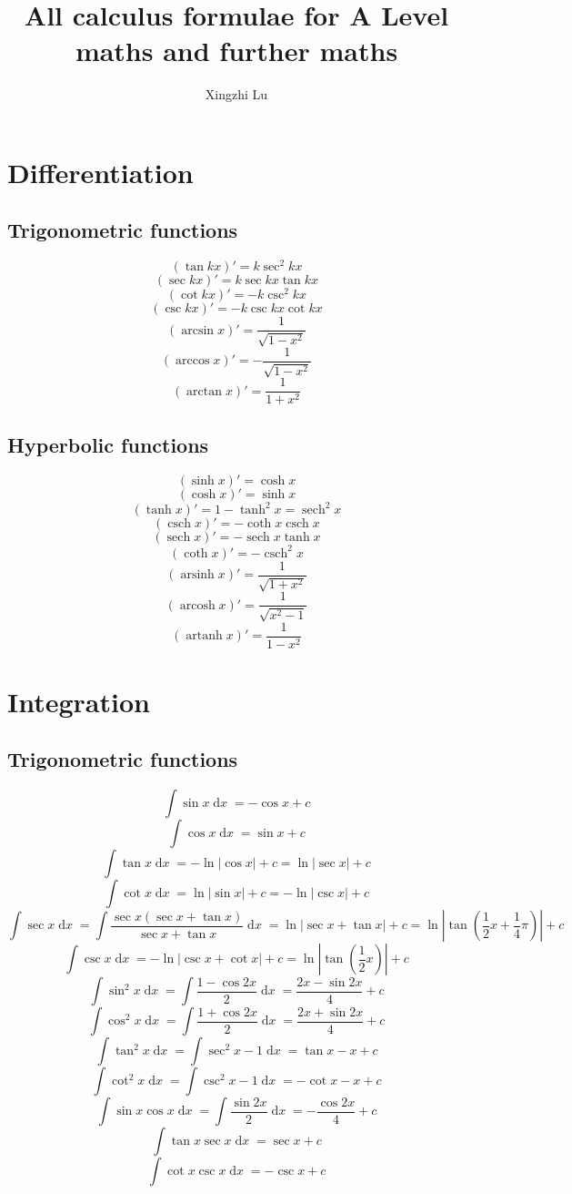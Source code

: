 \documentclass[fleqn, 11pt]{article}
\title{All calculus formulae for A Level maths and further maths}
\author{Xingzhi Lu}
\date{}
\DeclareMathOperator\dx{\mathrm{d}\mathit{x}}
\DeclareMathOperator\sech{sech}
\DeclareMathOperator\csch{csch}
\DeclareMathOperator\arsinh{arsinh}
\DeclareMathOperator\arcosh{arcosh}
\DeclareMathOperator\artanh{artanh}
\begin{document}
	\maketitle
	
	\section{Differentiation}
	\subsection{Trigonometric functions}
	\[(\tan kx)' = k\sec^2 kx\]
	\[(\sec kx)' = k\sec kx \tan kx\]
	\[(\cot kx)' = -k\csc^2 kx\]
	\[(\csc kx)' = -k\csc kx \cot kx\]
	\[(\arcsin x)' = \frac{1}{\sqrt{1-x^2}}\]
	\[(\arccos x)' = -\frac{1}{\sqrt{1-x^2}}\]
	\[(\arctan x)' = \frac{1}{1+x^2}\]
	\subsection{Hyperbolic functions}
	\[(\sinh x)'=\cosh x\]
	\[(\cosh x)'=\sinh x\]
	\[(\tanh x)'=1-\tanh^2 x = \sech^2 x\]
	\[(\csch x)'=-\coth x \csch x\]
	\[(\sech x)'=-\sech x \tanh x\]
	\[(\coth x)'=-\csch^2 x\]
	\[(\arsinh x)' = \dfrac{1}{\sqrt{1+x^2}}\]
	\[(\arcosh x)' = \dfrac{1}{\sqrt{x^2-1}}\]
	\[(\artanh x)' = \dfrac{1}{1-x^2}\]
	
	\pagebreak
	
	\section{Integration}
	\subsection{Trigonometric functions}
	\[\int\sin x \dx = -\cos x + c\]
	\[\int\cos x \dx = \sin x + c\]
	\[\int \tan x \dx = -\ln |\cos x| + c= \ln |\sec x| + c\]
	\[\int \cot x \dx = \ln |\sin x| + c = -\ln |\csc x| + c\]
	\[\int \sec x \dx = \int \frac{\sec x(\sec x + \tan x)}{\sec x + \tan x} \dx = \ln |\sec x + \tan x| + c = \ln \left|\tan\left(\frac{1}{2}x+\frac{1}{4}\pi \right)\right| + c\]
	\[\int \csc x \dx = -\ln|\csc x + \cot x| + c = \ln \left|\tan\left(\frac{1}{2}x\right)\right| + c\]
	\[\int \sin^2 x \dx = \int \frac{1-\cos 2x}{2} \dx = \frac{2x-\sin 2x}{4} + c\]
	\[\int \cos^2 x \dx = \int \frac{1+\cos 2x}{2} \dx = \frac{2x+\sin 2x}{4} + c\]
	\[\int \tan^2 x \dx = \int \sec^2 x -1 \dx = \tan x - x + c\]
	\[\int \cot^2 x \dx = \int \csc^2 x -1 \dx = -\cot x - x + c\]
	\[\int \sin x \cos x \dx = \int \frac{\sin 2x}{2} \dx = -\dfrac{\cos 2x}{4} + c\]
	\[\int \tan x \sec x \dx = \sec x + c\]
	\[\int \cot x \csc x \dx = -\csc x + c\]
\end{document}
